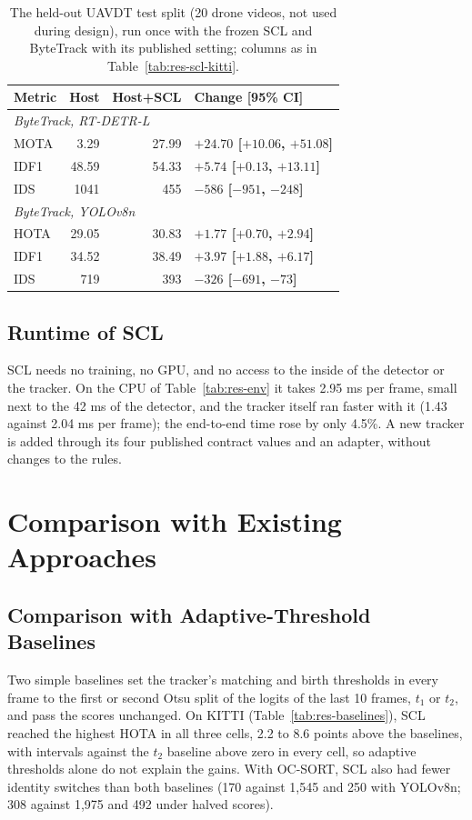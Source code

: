 \begin{table}[tbp]
\centering
\caption{The held-out UAVDT test split (20 drone videos, not used during design), run once with the frozen SCL and ByteTrack with its published setting; columns as in Table~\ref{tab:res-scl-kitti}.}
\label{tab:res-scl-uavdt}
\begin{tabular}{lrrl}
\toprule
Metric & Host & Host+SCL & Change [95\% CI]\\
\midrule
\multicolumn{4}{l}{\textit{ByteTrack, RT-DETR-L} \cite{zhang2022bytetrack,zhao2024rtdetr}}\\
\quad MOTA & 3.29 & 27.99 & \textbf{$+24.70$ [$+10.06$, $+51.08$]}\\
\quad IDF1 & 48.59 & 54.33 & \textbf{$+5.74$ [$+0.13$, $+13.11$]}\\
\quad IDS & 1041 & 455 & \textbf{$-586$ [$-951$, $-248$]}\\
\multicolumn{4}{l}{\textit{ByteTrack, YOLOv8n} \cite{zhang2022bytetrack,jocher2023yolov8}}\\
\quad HOTA & 29.05 & 30.83 & \textbf{$+1.77$ [$+0.70$, $+2.94$]}\\
\quad IDF1 & 34.52 & 38.49 & \textbf{$+3.97$ [$+1.88$, $+6.17$]}\\
\quad IDS & 719 & 393 & \textbf{$-326$ [$-691$, $-73$]}\\
\bottomrule
\end{tabular}
\end{table}

\subsection{Runtime of SCL}\label{sec:res-scl-runtime}
SCL needs no training, no GPU, and no access to the inside of the detector or the tracker. On the CPU of Table~\ref{tab:res-env} it takes 2.95 ms per frame, small next to the 42 ms of the detector, and the tracker itself ran faster with it (1.43 against 2.04 ms per frame); the end-to-end time rose by only 4.5\%. A new tracker is added through its four published contract values and an adapter, without changes to the rules.

\section{Comparison with Existing Approaches}\label{sec:res-compare}

\subsection{Comparison with Adaptive-Threshold Baselines}\label{sec:res-baselines}
Two simple baselines set the tracker's matching and birth thresholds in every frame to the first or second Otsu split of the logits of the last 10 frames, $t_1$ or $t_2$, and pass the scores unchanged. On KITTI (Table~\ref{tab:res-baselines}), SCL reached the highest HOTA in all three cells, 2.2 to 8.6 points above the baselines, with intervals against the $t_2$ baseline above zero in every cell, so adaptive thresholds alone do not explain the gains. With OC-SORT, SCL also had fewer identity switches than both baselines (170 against 1,545 and 250 with YOLOv8n; 308 against 1,975 and 492 under halved scores).

